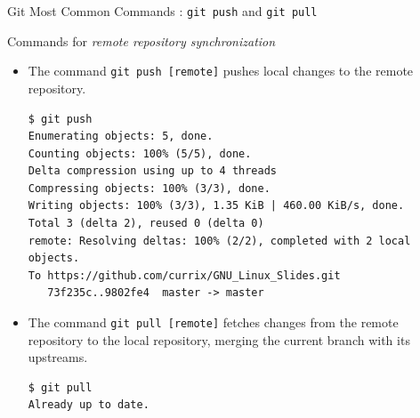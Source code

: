 \begin{frame}[t,fragile]{Git Most Common Commands : \alert{\texttt{git push}} and \alert{\texttt{git pull}}}
      \begin{block}{Commands for \emph{remote repository synchronization}}
        {\scriptsize
\begin{itemize}
  \item          The command  \alert{\texttt{git push [remote]}} pushes local changes to the remote repository.
          \begin{lstlisting}
$ git push
Enumerating objects: 5, done.
Counting objects: 100% (5/5), done.
Delta compression using up to 4 threads
Compressing objects: 100% (3/3), done.
Writing objects: 100% (3/3), 1.35 KiB | 460.00 KiB/s, done.
Total 3 (delta 2), reused 0 (delta 0)
remote: Resolving deltas: 100% (2/2), completed with 2 local objects.
To https://github.com/currix/GNU_Linux_Slides.git
   73f235c..9802fe4  master -> master
\end{lstlisting}
  \item  The command  \alert{\texttt{git pull [remote]}} fetches changes from the remote repository to the local repository, merging the current branch with its upstreams.
          \begin{lstlisting}
$ git pull
Already up to date.
\end{lstlisting}
\end{itemize}
}
\end{block}  
  
\end{frame}
